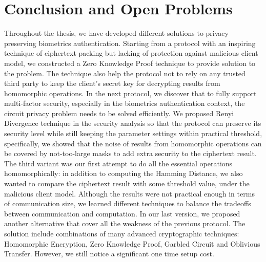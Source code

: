 \chapter{Conclusion and Open Problems}
\label{chap:conclusion}

\ifpdf
    \graphicspath{{Chapter8/Figs/Raster/}{Chapter8/Figs/PDF/}{Chapter8/Figs/}}
\else
    \graphicspath{{Chapter8/Figs/Vector/}{Chapter8/Figs/}}
\fi


Throughout the thesis, we have developed different solutions to privacy
preserving biometrics authentication. Starting from a protocol with an inspiring
technique of ciphertext packing but lacking of protection against malicious
client model, we constructed a Zero Knowledge Proof technique to provide
solution to the problem. The technique also help the protocol not to rely on any
trusted third party to keep the client's secret key for decrypting results from
homomorphic operations. In the next protocol, we discover that to fully support
multi-factor security, especially in the biometrics authentication context, the
circuit privacy problem needs to be solved efficiently. We proposed Renyi
Divergence technique in the security analysis so that the protocol can preserve
its security level while still keeping the parameter settings within practical
threshold, specifically, we showed that the noise of results from homomorphic
operations can be covered by not-too-large masks to add extra security to the
ciphertext result. The third variant was our first attempt to do all the
essential operations homomorphically: in addition to computing the Hamming
Distance, we also wanted to compare the ciphertext result with some threshold
value, under the malicious client model. Although the results were not practical
enough in terms of communication size, we learned different techniques to
balance the tradeoffs between communication and computation. In our last
version, we proposed another alternative that cover all the weakness of the
previous protocol. The solution include combinations of many advanced
cryptographic techniques: Homomorphic Encryption, Zero Knowledge Proof, Garbled
Circuit and Oblivious Transfer. However, we still notice a significant one time
setup cost.

